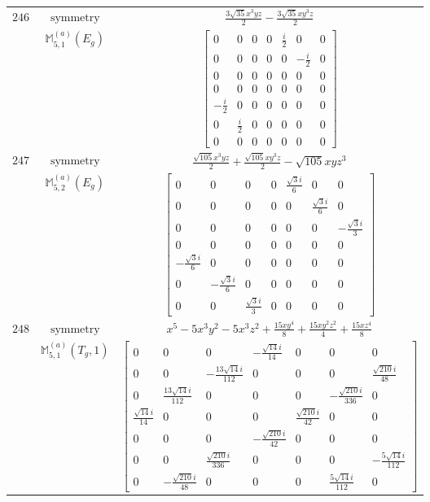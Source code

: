 \documentclass[fleqn,8pt,landscape]{jsarticle}
\begin{document}
\begin{longtable}{ccc}
$ 246 $ & $ \text{symmetry} $ & $ \frac{3 \sqrt{35} x^{3} y z}{2} - \frac{3 \sqrt{35} x y^{3} z}{2} $ \\
$  $ & $ \mathbb{M}_{5,1}^{(a)}(E_{g}) $ & $ \begin{bmatrix} 0 & 0 & 0 & 0 & \frac{i}{2} & 0 & 0 \\ 0 & 0 & 0 & 0 & 0 & - \frac{i}{2} & 0 \\ 0 & 0 & 0 & 0 & 0 & 0 & 0 \\ 0 & 0 & 0 & 0 & 0 & 0 & 0 \\ - \frac{i}{2} & 0 & 0 & 0 & 0 & 0 & 0 \\ 0 & \frac{i}{2} & 0 & 0 & 0 & 0 & 0 \\ 0 & 0 & 0 & 0 & 0 & 0 & 0 \end{bmatrix} $ \\ \hline
$ 247 $ & $ \text{symmetry} $ & $ \frac{\sqrt{105} x^{3} y z}{2} + \frac{\sqrt{105} x y^{3} z}{2} - \sqrt{105} x y z^{3} $ \\
$  $ & $ \mathbb{M}_{5,2}^{(a)}(E_{g}) $ & $ \begin{bmatrix} 0 & 0 & 0 & 0 & \frac{\sqrt{3} i}{6} & 0 & 0 \\ 0 & 0 & 0 & 0 & 0 & \frac{\sqrt{3} i}{6} & 0 \\ 0 & 0 & 0 & 0 & 0 & 0 & - \frac{\sqrt{3} i}{3} \\ 0 & 0 & 0 & 0 & 0 & 0 & 0 \\ - \frac{\sqrt{3} i}{6} & 0 & 0 & 0 & 0 & 0 & 0 \\ 0 & - \frac{\sqrt{3} i}{6} & 0 & 0 & 0 & 0 & 0 \\ 0 & 0 & \frac{\sqrt{3} i}{3} & 0 & 0 & 0 & 0 \end{bmatrix} $ \\ \hline
$ 248 $ & $ \text{symmetry} $ & $ x^{5} - 5 x^{3} y^{2} - 5 x^{3} z^{2} + \frac{15 x y^{4}}{8} + \frac{15 x y^{2} z^{2}}{4} + \frac{15 x z^{4}}{8} $ \\
$  $ & $ \mathbb{M}_{5,1}^{(a)}(T_{g},1) $ & $ \begin{bmatrix} 0 & 0 & 0 & - \frac{\sqrt{14} i}{14} & 0 & 0 & 0 \\ 0 & 0 & - \frac{13 \sqrt{14} i}{112} & 0 & 0 & 0 & \frac{\sqrt{210} i}{48} \\ 0 & \frac{13 \sqrt{14} i}{112} & 0 & 0 & 0 & - \frac{\sqrt{210} i}{336} & 0 \\ \frac{\sqrt{14} i}{14} & 0 & 0 & 0 & \frac{\sqrt{210} i}{42} & 0 & 0 \\ 0 & 0 & 0 & - \frac{\sqrt{210} i}{42} & 0 & 0 & 0 \\ 0 & 0 & \frac{\sqrt{210} i}{336} & 0 & 0 & 0 & - \frac{5 \sqrt{14} i}{112} \\ 0 & - \frac{\sqrt{210} i}{48} & 0 & 0 & 0 & \frac{5 \sqrt{14} i}{112} & 0 \end{bmatrix} $ \\ \hline

\end{longtable}
\end{document}
